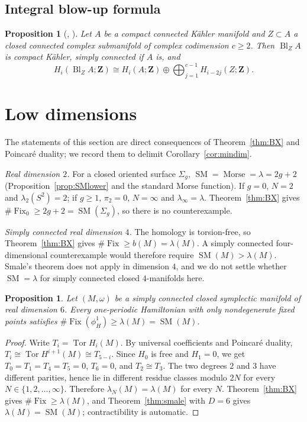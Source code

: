 \documentclass[11pt]{amsart}
\numberwithin{equation}{section}
\newtheorem{proposition}[theorem]{Proposition}
\theoremstyle{definition}
\theoremstyle{remark}
\newcommand{\Z}{\mathbf Z}
\DeclareMathOperator{\Tor}{Tor}
\DeclareMathOperator{\SM}{SM}
\DeclareMathOperator{\Morse}{Morse}
\DeclareMathOperator{\Fix}{Fix}
\DeclareMathOperator{\Bl}{Bl}
\begin{document}
\subsection{Integral blow-up formula}

\begin{proposition}[{\cite[Thm.~4.1]{DuanLi2009}}, {\cite[Prop.~3.3]{OpenAI22}}]\label{prop:blowup}
Let $A$ be a compact connected K\"ahler manifold and $Z\subset A$ a closed
connected complex submanifold of complex codimension $c\ge2$. Then
$\Bl_ZA$ is compact K\"ahler, simply connected if $A$ is, and
\[
  H_i(\Bl_ZA;\Z)\cong H_i(A;\Z)\oplus\bigoplus_{j=1}^{c-1}H_{i-2j}(Z;\Z).
\]
\end{proposition}

\section{Low dimensions}\label{sec:six}

The statements of this section are direct consequences of
Theorem~\ref{thm:BX} and Poincar\'e duality; we record them to delimit
Corollary~\ref{cor:mindim}.

\emph{Real dimension $2$.} For a closed oriented surface $\Sigma_g$,
$\SM=\Morse=\lambda=2g+2$ (Proposition~\ref{prop:SMlower} and the standard
Morse function). If $g=0$, $N=2$ and $\lambda_2(S^2)=2$; if $g\ge1$,
$\pi_2=0$, $N=\infty$ and $\lambda_\infty=\lambda$. Theorem~\ref{thm:BX}
gives $\#\Fix_0\ge2g+2=\SM(\Sigma_g)$, so there is no counterexample.

\emph{Simply connected real dimension $4$.} The homology is torsion-free,
so Theorem~\ref{thm:BX} gives $\#\Fix\ge b(M)=\lambda(M)$. A simply
connected four-dimensional counterexample would therefore require
$\SM(M)>\lambda(M)$. Smale's theorem does not apply in dimension $4$, and
we do not settle whether $\SM=\lambda$ for simply connected closed
$4$-manifolds here.

\begin{proposition}\label{prop:six}
Let $(M,\omega)$ be a simply connected closed symplectic manifold of real
dimension $6$. Every one-periodic Hamiltonian with only nondegenerate fixed
points satisfies $\#\Fix(\phi_H^1)\ge\lambda(M)=\SM(M)$.
\end{proposition}

\begin{proof}
Write $T_i=\Tor H_i(M)$. By universal coefficients and Poincar\'e duality,
$T_i\cong\Tor H^{i+1}(M)\cong T_{5-i}$. Since $H_0$ is free and $H_1=0$,
we get $T_0=T_1=T_4=T_5=0$, $T_6=0$, and $T_2\cong T_3$. The two degrees
$2$ and $3$ have different parities, hence lie in different residue
classes modulo $2N$ for every $N\in\{1,2,\dots,\infty\}$. Therefore
$\lambda_N(M)=\lambda(M)$ for every $N$. Theorem~\ref{thm:BX} gives
$\#\Fix\ge\lambda(M)$, and Theorem~\ref{thm:smale} with $D=6$ gives
$\lambda(M)=\SM(M)$; contractibility is automatic.
\end{proof}
\end{document}
